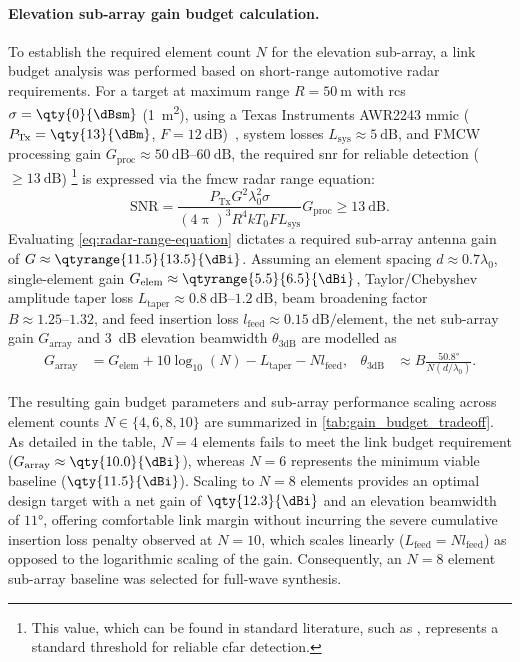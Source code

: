 \paragraph{Elevation sub-array gain budget calculation.}
To establish the required element count $N$ for the elevation sub-array, a link budget analysis was performed based on short-range automotive radar requirements.
For a target at maximum range $R = \qty{50}{\metre}$ with \gls{rcs} $\sigma = \qty{0}{\dBsm}$ (\qty{1}{\metre\squared}), using a Texas Instruments AWR2243 \gls{mmic} ($P_{\mathrm{Tx}} = \qty{13}{\dBm}$, $F = \qty{12}{\dB}$)~\parencite{texasInstrumentsAwrxCascadedRadar2020}, system losses $L_{\mathrm{sys}} \approx \qty{5}{\dB}$, and FMCW processing gain $G_{\mathrm{proc}} \approx \qtyrange{50}{60}{\dB}$, the required \gls{snr} for reliable detection ($\ge \qty{13}{\dB}$)%
    \footnote{This value, which can be found in standard literature, such as \textcite{skolnikRadarHandbookThird2008}, represents a standard threshold for reliable \gls{cfar} detection.}
is expressed via the \gls{fmcw} radar range equation:
\begin{equation}
    \label{eq:radar-range-equation}
    \text{SNR} = \frac{P_{\mathrm{Tx}} G^2 \lambda_0^2 \sigma}{(4\uppi)^3 R^4 k T_0 F L_{\mathrm{sys}}} G_{\mathrm{proc}} \ge \qty{13}{\dB}.
\end{equation}
Evaluating \cref{eq:radar-range-equation} dictates a required sub-array antenna gain of $G \approx \qtyrange{11.5}{13.5}{\dBi}$.
Assuming an element spacing $d \approx 0.7\lambda_0$, single-element gain $G_{\text{elem}} \approx \qtyrange{5.5}{6.5}{\dBi}$, Taylor/Chebyshev amplitude taper loss $L_{\text{taper}} \approx \qtyrange{0.8}{1.2}{\dB}$, beam broadening factor $B \approx \numrange{1.25}{1.32}$, and feed insertion loss $l_{\text{feed}} \approx \qty{0.15}{\dB/\text{element}}$, the net sub-array gain $G_{\text{array}}$ and \qty{3}{\dB} elevation beamwidth $\theta_{\text{3dB}}$ are modelled as
\begin{align}
    \label{eq:array-gain-budget}
    G_{\text{array}} &= G_{\text{elem}} + 10\log_{10}(N) - L_{\text{taper}} - Nl_{\text{feed}},
&
    \theta_{\text{3dB}} &\approx B \frac{\ang{50.8}}{N (d/\lambda_0)}.
\end{align}

The resulting gain budget parameters and sub-array performance scaling across element counts $N \in \{4, 6, 8, 10\}$ are summarized in \cref{tab:gain_budget_tradeoff}.
As detailed in the table, $N = 4$ elements fails to meet the link budget requirement ($G_{\text{array}} \approx \qty{10.0}{\dBi}$), whereas $N = 6$ represents the minimum viable baseline ($\qty{11.5}{\dBi}$).
Scaling to $N = 8$ elements provides an optimal design target with a net gain of $\qty{12.3}{\dBi}$ and an elevation beamwidth of $\ang{11}$, offering comfortable link margin without incurring the severe cumulative insertion loss penalty observed at $N = 10$, which scales linearly ($L_{\text{feed}} = N l_{\text{feed}}$) as opposed to the logarithmic scaling of the gain.
Consequently, an $N = 8$ element sub-array baseline was selected for full-wave synthesis.

